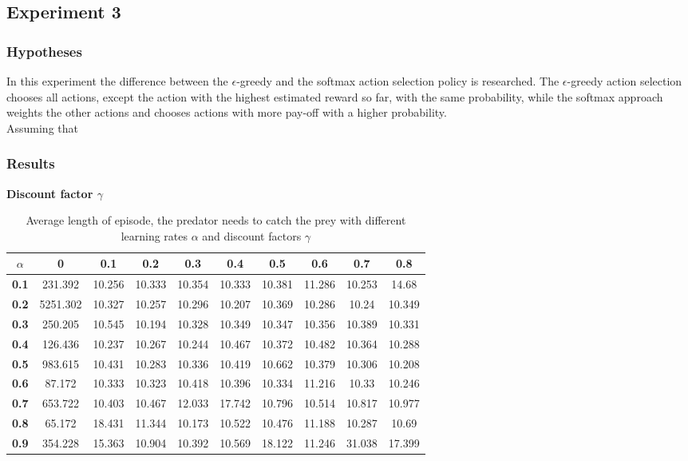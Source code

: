 \documentclass[11pt]{article}
\begin{document}
\subsection{Experiment 3}

\subsubsection{Hypotheses}
In this experiment the difference between the $\epsilon$-greedy and the softmax action selection policy is researched. The $\epsilon$-greedy action selection chooses all actions, except the action with the highest estimated reward so far, with the same probability, while the softmax approach weights the other actions and chooses actions with more pay-off with a higher probability.\\
Assuming that 
\subsubsection{Results}
\begin{center}
\begin{table*}[ht]
{\small
\hfill{}
\begin{center}
\textbf{Discount factor $\gamma$}\\
\end{center}
\begin{tabular}{c|c|c|c|c|c|c|c|c|c}
\textbf{$\alpha$} & \textbf{0} & \textbf{0.1} & \textbf{0.2} & \textbf{0.3} & \textbf{0.4} & \textbf{0.5} & \textbf{0.6} & \textbf{0.7} & \textbf{0.8}\\
	\hline
\textbf{0.1} & 231.392 & 10.256 & 10.333 & 10.354 & 10.333 & 10.381 & 11.286 & 10.253 & 14.68\\
\textbf{0.2} & 5251.302 & 10.327 & 10.257 & 10.296 & 10.207 & 10.369 & 10.286 & 10.24 & 10.349 \\
\textbf{0.3} & 250.205 & 10.545 & 10.194 & 10.328 & 10.349 & 10.347 & 10.356 & 10.389 & 10.331 \\
\textbf{0.4} & 126.436 & 10.237 & 10.267 & 10.244 & 10.467 & 10.372 & 10.482 & 10.364 & 10.288 \\
\textbf{0.5} & 983.615 & 10.431 & 10.283 & 10.336 & 10.419 & 10.662 & 10.379 & 10.306 & 10.208 \\
\textbf{0.6} & 87.172 & 10.333 & 10.323 & 10.418 & 10.396 & 10.334 & 11.216 & 10.33 & 10.246\\
\textbf{0.7} & 653.722 & 10.403 & 10.467 & 12.033 & 17.742 & 10.796 & 10.514 & 10.817 & 10.977 \\
\textbf{0.8} & 65.172 & 18.431 & 11.344 & 10.173 & 10.522 & 10.476 & 11.188 & 10.287 & 10.69\\
\textbf{0.9} & 354.228 & 15.363 & 10.904 & 10.392 & 10.569 & 18.122 & 11.246 & 31.038 & 17.399\\
\end{tabular}}
\hfill{}
\caption{Average length of episode, the predator needs to catch the prey with different learning rates $\alpha$ and discount factors $\gamma$}
\label{table:task1}
\end{table*}
\end{center}
\end{document}
